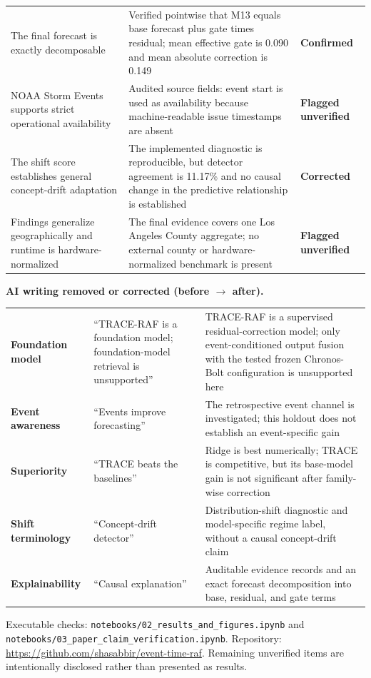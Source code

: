 \documentclass{article}
\newcommand{\C}{\cellcolor{confirmed}\textbf{Confirmed}}
\newcommand{\R}{\cellcolor{corrected}\textbf{Corrected}}
\newcommand{\F}{\cellcolor{flagged}\textbf{Flagged unverified}}
\begin{document}
\begin{tabularx}{\textwidth}{>{\raggedright\arraybackslash}p{}
>{\raggedright\arraybackslash}X
>{\raggedright\arraybackslash}p{}}
The final forecast is exactly decomposable & Verified pointwise that M13 equals base forecast plus gate times residual; mean effective gate is 0.090 and mean absolute correction is 0.149 & \C \\
NOAA Storm Events supports strict operational availability & Audited source fields: event start is used as availability because machine-readable issue timestamps are absent & \F \\
The shift score establishes general concept-drift adaptation & The implemented diagnostic is reproducible, but detector agreement is 11.17\% and no causal change in the predictive relationship is established & \R \\
Findings generalize geographically and runtime is hardware-normalized & The final evidence covers one Los Angeles County aggregate; no external county or hardware-normalized benchmark is present & \F \\
\bottomrule
\end{tabularx}

\vspace{3pt}
\textbf{AI writing removed or corrected (before $\rightarrow$ after).}\par
\begin{tabularx}{\textwidth}{>{\bfseries}p{}X X}
Foundation model & ``TRACE-RAF is a foundation model; foundation-model retrieval is unsupported'' & TRACE-RAF is a supervised residual-correction model; only event-conditioned output fusion with the tested frozen Chronos-Bolt configuration is unsupported here \\
Event awareness & ``Events improve forecasting'' & The retrospective event channel is investigated; this holdout does not establish an event-specific gain \\
Superiority & ``TRACE beats the baselines'' & Ridge is best numerically; TRACE is competitive, but its base-model gain is not significant after family-wise correction \\
Shift terminology & ``Concept-drift detector'' & Distribution-shift diagnostic and model-specific regime label, without a causal concept-drift claim \\
Explainability & ``Causal explanation'' & Auditable evidence records and an exact forecast decomposition into base, residual, and gate terms \\
\end{tabularx}

\vfill
{\footnotesize Executable checks: \texttt{notebooks/02\_results\_and\_figures.ipynb} and
\texttt{notebooks/03\_paper\_claim\_verification.ipynb}. Repository:
\url{https://github.com/shasabbir/event-time-raf}. Remaining unverified items are intentionally disclosed rather than presented as results.}
\end{document}
